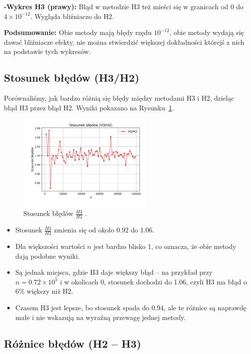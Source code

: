 \documentclass[a4paper,12pt]{article}
\begin{document}
\textbf{-Wykres H3 (prawy):} Błąd w metodzie H3 też mieści się w granicach od 0 do \( 4 \times 10^{-12} \). Wygląda bliźniaczo do H2.

\textbf{Podsumowanie:} Obie metody mają błędy rzędu \( 10^{-12} \), obie metody wydają się dawać bliźniacze efekty, nie można stwierdzić większej dokładności którejś z nich na podstawie tych wykresów.


\subsection{Stosunek błędów (H3/H2)}

Porównaliśmy, jak bardzo różnią się błędy między metodami H3 i H2, dzieląc błąd H3 przez błąd H2. Wyniki pokazano na Rysunku~\ref{fig:ratio}.

\begin{figure}[h]
    \centering
    \includegraphics[width=0.6\textwidth]{stosunek_bledow_h3h2.pdf}
    \caption{Stosunek błędów \( \frac{H3}{H2} \) .}
    \label{fig:ratio}
\end{figure}

\begin{itemize}
    \item Stosunek \( \frac{H3}{H2} \) zmienia się od około 0.92 do 1.06.
    \item Dla większości wartości \( n \) jest bardzo blisko 1, co oznacza, że obie metody dają podobne wyniki.
    \item Są jednak miejsca, gdzie H3 daje większy błąd – na przykład przy \( n = 0.72 \times 10^5 \) i w okolicach 0, stosunek dochodzi do 1.06, czyli H3 ma błąd o 6\% większy niż H2.
    \item Czasem H3 jest lepsze, bo stosunek spada do 0.94, ale te różnice są naprawdę małe i nie wskazują na wyraźną przewagę jednej metody.


\end{itemize}

\subsection{Różnice błędów (H2 – H3)}
\end{document}
